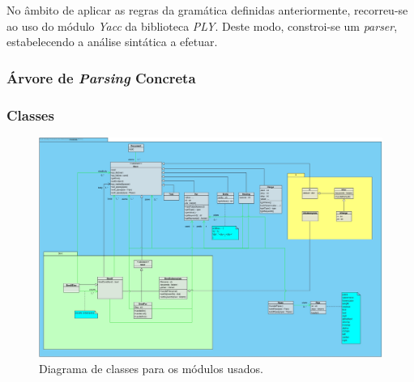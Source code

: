 \documentclass[../relatorio.tex]{subfiles}
\begin{document}

No âmbito de aplicar as regras da gramática definidas anteriormente,
recorreu-se ao uso do módulo \textit{Yacc} da biblioteca \textit{PLY}. 
Deste modo, constroi-se um \textit{parser}, estabelecendo a análise 
sintática a efetuar.

\subsubsection{Árvore de \textit{Parsing} Concreta}


\subsubsection{Classes}


\begin{figure}
    \centering
    \includegraphics[width=\linewidth]{assets/class_diagram.jpg}
    \caption{Diagrama de classes para os módulos usados.}
    \label{fig:diag_classes}
\end{figure}
\end{document}
